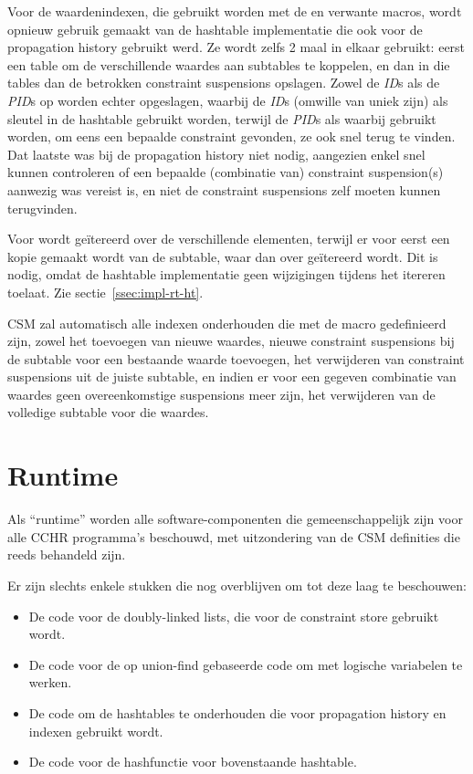Voor de waardenindexen, die gebruikt worden met de  en verwante macros, wordt opnieuw gebruik gemaakt van de hashtable implementatie die ook voor de propagation history gebruikt werd. Ze wordt zelfs 2 maal in elkaar gebruikt: eerst een table om de verschillende waardes aan subtables te koppelen, en dan in die tables dan de betrokken constraint suspensions opslagen. Zowel de {\em ID}s als de {\em PID}s op worden echter opgeslagen, waarbij de {\em ID}s (omwille van uniek zijn) als sleutel in de hashtable gebruikt worden, terwijl de {\em PID}s als waarbij gebruikt worden, om eens een bepaalde constraint gevonden, ze ook snel terug te vinden. Dat laatste was bij de propagation history niet nodig, aangezien enkel snel kunnen controleren of een bepaalde (combinatie van) constraint suspension(s) aanwezig was vereist is, en niet de constraint suspensions zelf moeten kunnen terugvinden.

Voor  wordt ge\"itereerd over de verschillende elementen, terwijl er voor  eerst een kopie gemaakt wordt van de subtable, waar dan over ge\"itereerd wordt. Dit is nodig, omdat de hashtable implementatie geen wijzigingen tijdens het itereren toelaat. Zie sectie~\ref{ssec:impl-rt-ht}.

CSM zal automatisch alle indexen onderhouden die met de macro  gedefinieerd zijn, zowel het toevoegen van nieuwe waardes, nieuwe constraint suspensions bij de subtable voor een bestaande waarde toevoegen, het verwijderen van constraint suspensions uit de juiste subtable, en indien er voor een gegeven combinatie van waardes geen overeenkomstige suspensions meer zijn, het verwijderen van de volledige subtable voor die waardes.

\section{Runtime} \label{sec:runtime}

Als ``runtime'' worden alle software-componenten die gemeenschappelijk zijn voor alle CCHR programma's beschouwd, met uitzondering van de CSM definities die reeds behandeld zijn.

Er zijn slechts enkele stukken die nog overblijven om tot deze laag te beschouwen: \begin{itemize}
  \item De code voor de doubly-linked lists, die voor de constraint store gebruikt wordt.
  \item De code voor de op union-find gebaseerde code om met logische variabelen te werken.
  \item De code om de hashtables te onderhouden die voor propagation history en indexen gebruikt wordt.
  \item De code voor de hashfunctie voor bovenstaande hashtable.
\end{itemize}

